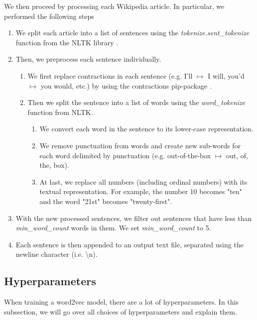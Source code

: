 We then proceed by processing each Wikipedia article. In particular, we performed the following steps
\begin{enumerate}
    \item We split each article into a list of sentences using the \textit{tokenize.sent\_tokenize} function from the NLTK library \cite{bird2009natural}.
    \item Then, we preprocess each sentence individually.
    \begin{enumerate}
        \item We first replace contractions in each sentence (e.g. I'll $\mapsto$ I will, you'd $\mapsto$ you would, etc.) by using the contractions pip-package \cite{contractions-2016}.
        \item Then we split the sentence into a list of words using the \textit{word\_tokenize} function from NLTK.
        \begin{enumerate}
            \item We convert each word in the sentence to its lower-case representation.
            \item We remove punctuation from words and create new sub-words for each word delimited by punctuation (e.g. out-of-the-box $\mapsto$ out, of, the, box).
            \item At last, we replace all numbers (including ordinal numbers) with its textual representation. For example, the number 10 becomes "ten" and the word "21st" becomes "twenty-first".
        \end{enumerate}
    \end{enumerate}
    \item With the new processed sentences, we filter out sentences that have less than \textit{min\_word\_count} words in them. We set \textit{min\_word\_count} to 5.
    \item Each sentence is then appended to an output text file, separated using the newline character (i.e. \textbackslash n).
\end{enumerate}

\subsection{Hyperparameters}
When training a word2vec model, there are a lot of hyperparameters. In this subsection, we will go over all choices of hyperparameters and explain them.

